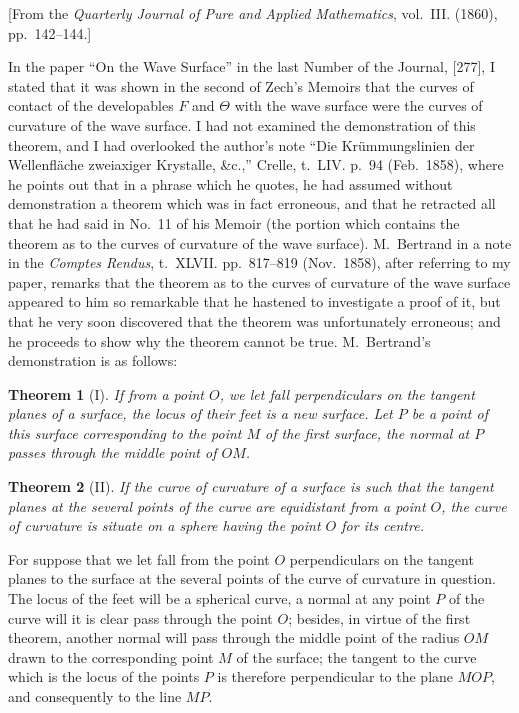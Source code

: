 \documentclass[11pt,a4paper]{book}
\newtheorem*{theorem}{Theorem}
\begin{document}
[From the \textit{Quarterly Journal of Pure and Applied Mathematics}, vol.~III. (1860), pp.~142--144.]

In the paper ``On the Wave Surface'' in the last Number of the Journal, [277], I stated that it was shown in the second of Zech's Memoirs that the curves of contact of the developables $F$ and $\Theta$ with the wave surface were the curves of curvature of the wave surface. I had not examined the demonstration of this theorem, and I had overlooked the author's note ``Die Kr\"{u}mmungslinien der Wellenfl\"{a}che zweiaxiger Krystalle, \&c.,'' Crelle, t.~LIV. p.~94 (Feb.~1858), where he points out that in a phrase which he quotes, he had assumed without demonstration a theorem which was in fact erroneous, and that he retracted all that he had said in No.~11 of his Memoir (the portion which contains the theorem as to the curves of curvature of the wave surface). M.~Bertrand in a note in the \textit{Comptes Rendus}, t.~XLVII. pp.~817--819 (Nov.~1858), after referring to my paper, remarks that the theorem as to the curves of curvature of the wave surface appeared to him so remarkable that he hastened to investigate a proof of it, but that he very soon discovered that the theorem was unfortunately erroneous; and he proceeds to show why the theorem cannot be true. M.~Bertrand's demonstration is as follows:

\begin{theorem}[I]
If from a point $O$, we let fall perpendiculars on the tangent planes of a surface, the locus of their feet is a new surface. Let $P$ be a point of this surface corresponding to the point $M$ of the first surface, the normal at $P$ passes through the middle point of $OM$.
\end{theorem}

\begin{theorem}[II]
If the curve of curvature of a surface is such that the tangent planes at the several points of the curve are equidistant from a point $O$, the curve of curvature is situate on a sphere having the point $O$ for its centre.
\end{theorem}

For suppose that we let fall from the point $O$ perpendiculars on the tangent planes to the surface at the several points of the curve of curvature in question. The locus of the feet will be a spherical curve, a normal at any point $P$ of the curve will it is clear pass through the point $O$; besides, in virtue of the first theorem, another normal will pass through the middle point of the radius $OM$ drawn to the corresponding point $M$ of the surface; the tangent to the curve which is the locus of the points $P$ is therefore perpendicular to the plane $MOP$, and consequently to the line $MP$.
\end{document}
